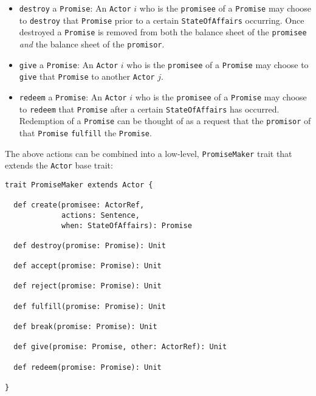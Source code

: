 \documentclass[a4paper]{article}
\begin{document}
\begin{itemize}
{	%
	} 
	\item \texttt{destroy} a \texttt{Promise}: An \texttt{Actor} $i$ who is the \texttt{promisee} of a \texttt{Promise} may choose to \texttt{destroy} that \texttt{Promise} prior to a certain \texttt{StateOfAffairs} occurring. Once destroyed a \texttt{Promise} is removed from both the balance sheet of the \texttt{promisee} \textit{and} the balance sheet of the \texttt{promisor}.   
	\item \texttt{give} a \texttt{Promise}: An \texttt{Actor} $i$ who is the \texttt{promisee} of a \texttt{Promise} may choose to \texttt{give} that \texttt{Promise} to another \texttt{Actor} $j$.
	\item \texttt{redeem} a \texttt{Promise}:  An \texttt{Actor} $i$ who is the \texttt{promisee} of a \texttt{Promise} may choose to \texttt{redeem} that \texttt{Promise} after a certain \texttt{StateOfAffairs} has occurred. Redemption of a \texttt{Promise} can be thought of as a request that the \texttt{promisor} of that \texttt{Promise} \texttt{fulfill} the \texttt{Promise}.
\end{itemize}

The above actions can be combined into a low-level, \texttt{PromiseMaker} trait that extends the \texttt{Actor} base trait:
\begin{verbatim}
trait PromiseMaker extends Actor {
  
  def create(promisee: ActorRef,
             actions: Sentence,
             when: StateOfAffairs): Promise
  
  def destroy(promise: Promise): Unit
  
  def accept(promise: Promise): Unit
  
  def reject(promise: Promise): Unit
  
  def fulfill(promise: Promise): Unit
  
  def break(promise: Promise): Unit
  
  def give(promise: Promise, other: ActorRef): Unit
  
  def redeem(promise: Promise): Unit
  
}
\end{verbatim}
\end{document}
